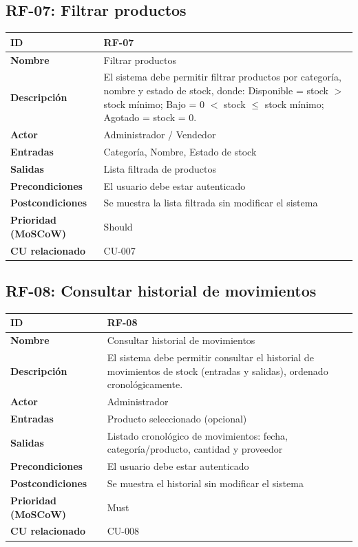 \documentclass[12pt, a4paper]{article}
\begin{document}
\subsection{RF-07: Filtrar productos}
\begin{center}
\renewcommand{\arraystretch}{1.4}
\begin{tabular}{|L{4cm}|L{12cm}|}
\hline
\textbf{ID} & RF-07 \\
\hline
\textbf{Nombre} & Filtrar productos \\
\hline
\textbf{Descripción} & El sistema debe permitir filtrar productos por categoría, nombre y estado de stock, donde: Disponible = stock $>$ stock mínimo; Bajo = 0 $<$ stock $\leq$ stock mínimo; Agotado = stock = 0. \\
\hline
\textbf{Actor} & Administrador / Vendedor \\
\hline
\textbf{Entradas} & Categoría, Nombre, Estado de stock \\
\hline
\textbf{Salidas} & Lista filtrada de productos \\
\hline
\textbf{Precondiciones} & El usuario debe estar autenticado \\
\hline
\textbf{Postcondiciones} & Se muestra la lista filtrada sin modificar el sistema \\
\hline
\textbf{Prioridad (MoSCoW)} & Should \\
\hline
\textbf{CU relacionado} & CU-007 \\
\hline
\end{tabular}
\end{center}

\subsection{RF-08: Consultar historial de movimientos}
\begin{center}
\renewcommand{\arraystretch}{1.4}
\begin{tabular}{|L{4cm}|L{12cm}|}
\hline
\textbf{ID} & RF-08 \\
\hline
\textbf{Nombre} & Consultar historial de movimientos \\
\hline
\textbf{Descripción} & El sistema debe permitir consultar el historial de movimientos de stock (entradas y salidas), ordenado cronológicamente. \\
\hline
\textbf{Actor} & Administrador \\
\hline
\textbf{Entradas} & Producto seleccionado (opcional) \\
\hline
\textbf{Salidas} & Listado cronológico de movimientos: fecha, categoría/producto, cantidad y proveedor \\
\hline
\textbf{Precondiciones} & El usuario debe estar autenticado \\
\hline
\textbf{Postcondiciones} & Se muestra el historial sin modificar el sistema \\
\hline
\textbf{Prioridad (MoSCoW)} & Must \\
\hline
\textbf{CU relacionado} & CU-008 \\
\hline
\end{tabular}
\end{center}
\end{document}
